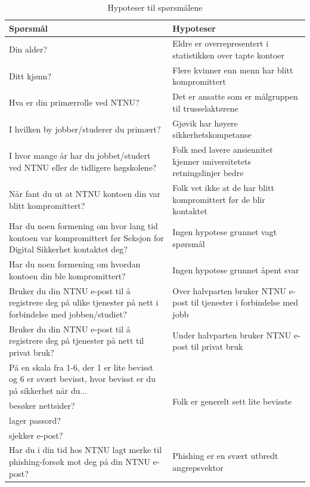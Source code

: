 \begin{table}[H]
  \centering
  \caption{Hypoteser til spørsmålene}
    \begin{tabular}{|p{20.215em}|p{20.57em}|}
    \hline
    \rowcolor{yellow} Spørsmål & Hypoteser \\
    \hline
    Din alder? & Eldre er overrepresentert i statistikken over tapte kontoer \\
    \hline
    Ditt kjønn? & Flere kvinner enn menn har blitt kompromittert \\
    \hline
    Hva er din primærrolle ved NTNU? & Det er ansatte som er målgruppen til trusselaktørene \\
    \hline
    I hvilken by jobber/studerer du primært? & Gjøvik har høyere sikkerhetskompetanse \\
    \hline
    I hvor mange år har du jobbet/studert ved NTNU eller de tidligere høgskolene? & Folk med lavere ansiennitet kjenner universitetets retningslinjer bedre \\
    \hline
    Når fant du ut at NTNU kontoen din var blitt kompromittert? & Folk vet ikke at de har blitt kompromittert før de blir kontaktet \\
    \hline
    Har du noen formening om hvor lang tid kontoen var kompromittert før Seksjon for Digital Sikkerhet kontaktet deg? & Ingen hypotese grunnet vagt spørsmål \\
    \hline
    Har du noen formening om hvordan kontoen din ble kompromittert? & Ingen hypotese grunnet åpent svar \\
    \hline
    Bruker du din NTNU e-post til å registrere deg på ulike tjenester på nett i forbindelse med jobben/studiet? & Over halvparten bruker NTNU e-post til tjenester i forbindelse med jobb \\
    \hline
    Bruker du din NTNU e-post til å registrere deg på tjenester på nett til privat bruk? & Under halvparten bruker NTNU e-post til privat bruk \\
    \hline
    På en skala fra 1-6, der 1 er lite bevisst og 6 er svært bevisst, hvor bevisst er du på sikkerhet når du... & \multirow{4}[2]{*}{Folk er generelt sett lite bevisste} \\
    besøker nettsider? & \multicolumn{1}{r|}{} \\
    lager passord? & \multicolumn{1}{r|}{} \\
    sjekker e-post? & \multicolumn{1}{r|}{} \\
    \hline
    Har du i din tid hos NTNU lagt merke til phishing-forsøk mot deg på din NTNU e-post? & Phishing er en svært utbredt angrepsvektor \\

\end{tabular}
\end{table}
